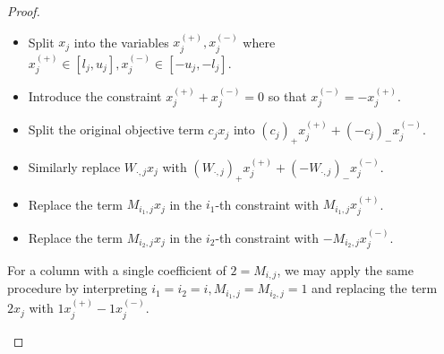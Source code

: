 \documentclass[a4paper,UKenglish,cleveref,thm-restate]{lipics-v2021}
\begin{document}
\begin{proof}
\begin{claimproof}
        \begin{itemize}
            \item Split $x_j$ into the variables $x_j^{(+)},x_j^{(-)}$ where $x_j^{(+)}\in[l_j,u_j],x_j^{(-)}\in[-u_j,-l_j]$.
            \item Introduce the constraint $x_j^{(+)}+x_j^{(-)}=0$ so that $x_j^{(-)}=-x_j^{(+)}$.
            \item Split the original objective term $c_jx_j$ into $(c_j)_+x_j^{(+)}+(-c_j)_-x_j^{(-)}$.
            \item Similarly replace $W_{\cdot,j}x_j$ with $(W_{\cdot,j})_+x_j^{(+)}+(-W_{\cdot,j})_-x_j^{(-)}$.
            \item Replace the term $M_{i_1,j}x_j$ in the $i_1$-th constraint with $M_{i_1,j}x_j^{(+)}$.
            \item Replace the term $M_{i_2,j}x_j$ in the $i_2$-th constraint with $-M_{i_2,j}x_j^{(-)}$.
        \end{itemize}
        For a column with a single coefficient of $2=M_{i,j}$, we may apply the same procedure by interpreting $i_1=i_2=i,M_{i_1,j}=M_{i_2,j}=1$ and replacing the term $2x_j$ with $1x_j^{(+)}-1x_j^{(-)}$.
        

\end{claimproof}
\end{proof}
\end{document}
